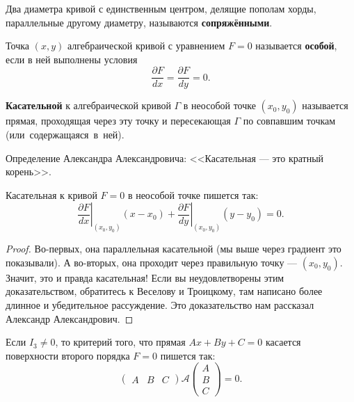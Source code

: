 \begin{definition}
    Два диаметра кривой с единственным центром, делящие пополам хорды, параллельные другому диаметру, называются \textbf{сопряжёнными}.
\end{definition}

\begin{definition}
    Точка $(x, y)$ алгебраической кривой с уравнением $F = 0$ называется \textbf{особой}, если в ней выполнены условия
    $$
    \frac{\partial F}{dx} = \frac{\partial F}{dy} = 0.
    $$
\end{definition}

\begin{definition}
    \textbf{Касательной} к алгебраической кривой $\Gamma$ в неособой точке $(x_0, y_0)$ называется прямая, проходящая через эту точку и пересекающая $\Gamma$ по совпавшим точкам \mbox{(или содержащаяся в ней)}.
\end{definition}

\begin{remark}
    Определение Александра Александровича: <<Касательная --- это кратный корень>>.
\end{remark}

\begin{theorem}
    Касательная к кривой $F = 0$ в неособой точке пишется так:
    $$
    \left.\frac{\partial F}{dx}\right|_{(x_0, y_0)}(x - x_0) + 
    \left.\frac{\partial F}{dy}\right|_{(x_0, y_0)}(y - y_0) = 0.
    $$
\end{theorem}

\begin{proof}
    Во-первых, она параллельная касательной (мы выше через градиент это показывали). А во-вторых, она проходит через правильную точку --- $(x_0, y_0)$. Значит, это и правда касательная! Если вы неудовлетворены этим доказательством, обратитесь к Веселову и Троицкому, там написано более длинное и убедительное рассуждение. Это доказательство нам рассказал Александр Александрович.
\end{proof}

\begin{theorem}
    Если $I_3 \ne 0$, то критерий того, что прямая $Ax + By + C = 0$ касается поверхности второго порядка $F = 0$ пишется так:
    $$
    \begin{pmatrix}
        A & B & C
    \end{pmatrix}\mathcal{A}
    \begin{pmatrix}
        A\\ B\\ C
    \end{pmatrix} = 0.
    $$
\end{theorem}


